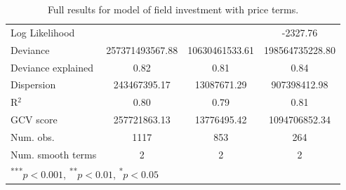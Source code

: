 \documentclass[11pt]{article}
\begin{document}
\begin{spacing}{1}
\begin{table}
\begin{center}
\begin{tabular}{l c c c }
Log Likelihood                       &                 &                & -2327.76        \\
Deviance                             & 257371493567.88 & 10630461533.61 & 198564735228.80 \\
Deviance explained                   & 0.82            & 0.81           & 0.84            \\
Dispersion                           & 243467395.17    & 13087671.29    & 907398412.98    \\
R$^2$                                & 0.80            & 0.79           & 0.81            \\
GCV score                            & 257721863.13    & 13776495.42    & 1094706852.34   \\
Num. obs.                            & 1117            & 853            & 264             \\
Num. smooth terms                    & 2               & 2              & 2               \\
\hline
\multicolumn{4}{l}{\scriptsize{\textsuperscript{***}$p<0.001$, 
  \textsuperscript{**}$p<0.01$, 
  \textsuperscript{*}$p<0.05$}}
\end{tabular}
\caption{Full results for model of field investment with price terms.}
\label{table:investment}
\end{center}
\end{table}





\end{spacing}
\end{document}
